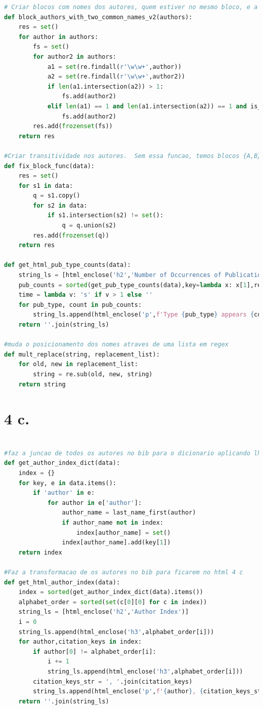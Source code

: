 \documentclass[11pt,a4paper]{report}
\begin{document}
\begin{lstlisting}[language=python]
# Criar blocos com nomes dos autores, quem estiver no mesmo bloco, e a mesma pessoa.
def block_authors_with_two_common_names_v2(authors):
    res = set()
    for author in authors:
        fs = set()
        for author2 in authors:
            a1 = set(re.findall(r'\w\w+',author))
            a2 = set(re.findall(r'\w\w+',author2))
            if len(a1.intersection(a2)) > 1:
                fs.add(author2)
            elif len(a1) == 1 and len(a1.intersection(a2)) == 1 and is_a_first_last_match(author,author2):
                fs.add(author2)
        res.add(frozenset(fs))
    return res

#Criar transitividade nos autores.  Sem essa funcao, temos blocos {A,B} e {B,C} Depois dessa funcao, vamos ter {A,B,C}
def fix_block_func(data):
    res = set()
    for s1 in data:
        q = s1.copy()
        for s2 in data:
            if s1.intersection(s2) != set():
                q = q.union(s2)
        res.add(frozenset(q))
    return res

def get_html_pub_type_counts(data):
    string_ls = [html_enclose('h2','Number of Occurrences of Publication Types')]
    pub_counts = sorted(get_pub_type_counts(data),key=lambda x: x[1],reverse=True)
    time = lambda v: 's' if v > 1 else ''
    for pub_type, count in pub_counts:
        string_ls.append(html_enclose('p',f'Type {pub_type} appears {count} time{time(count)}'))
    return ''.join(string_ls)

#muda o posicionamento dos nomes atraves de uma lista em regex
def mult_replace(string, replacement_list):
    for old, new in replacement_list:
        string = re.sub(old, new, string)
    return string

\end{lstlisting}
\section{4 c.}
\begin{lstlisting}[language=python]

#faz a juncao de todos os autores no bib para o dicionario aplicando lhe um primeiro filtro
def get_author_index_dict(data):
    index = {}
    for key, e in data.items():
        if 'author' in e:
            for author in e['author']:
                author_name = last_name_first(author)
                if author_name not in index:
                    index[author_name] = set()
                index[author_name].add(key[1])
    return index

#Faz a transformacao de os autores no bib para ficarem no html 4 c
def get_html_author_index(data):
    index = sorted(get_author_index_dict(data).items())
    alphabet_order = sorted(set(c[0][0] for c in index))
    string_ls = [html_enclose('h2','Author Index')]
    i = 0
    string_ls.append(html_enclose('h3',alphabet_order[i]))
    for author,citation_keys in index:
        if author[0] != alphabet_order[i]:
            i += 1
            string_ls.append(html_enclose('h3',alphabet_order[i]))
        citation_keys_str = ', '.join(citation_keys)
        string_ls.append(html_enclose('p',f'{author}, {citation_keys_str}'))
    return ''.join(string_ls)
\end{lstlisting}
\end{document}
